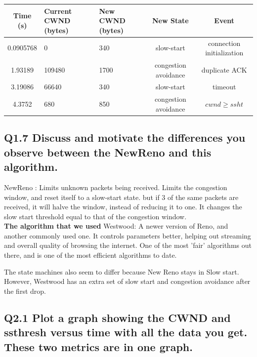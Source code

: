 \documentclass{article}
\begin{document}
\begin{table}[H]
\centering
\begin{tabular}{|c|p{25mm}|p{20mm}|c|c|}
\hline Time (s)    & Current CWND (bytes)    & New CWND (bytes)    & New State    & Event \\
\hline 0.0905768   & 0                       & 340          & slow-start          & connection initialization\\
\hline 1.93189     & 109480                  & 1700        & congestion avoidance   & duplicate ACK\\
\hline 3.19086     & 66640                  & 340          & slow-start          & timeout\\ 
\hline 4.3752     & 680                     & 850          & congestion avoidance   & $cwnd \geq ssht$ \\
\hline  
\end{tabular} 
\end{table}



\subsection{Q1.7 Discuss and motivate the differences you observe
between the NewReno and this algorithm.} %

NewReno : Limits unknown packets being received. Limits the congestion window, and reset itself to a slow-start state. but if 3 of the same packets are received, it will halve the window, instead of reducing it to one. It changes the slow start threshold equal to that of the congestion window.
\\
\textbf{The algorithm that we used}
Westwood: A newer version of Reno, and another commonly used one. It controls parameters better, helping out streaming and overall quality of browsing the internet. One of the most 'fair' algorithms out there, and is one of the most efficient algorithms to date. 

The state machines also seem to differ because New Reno stays in Slow start. However, Westwood has an extra set of slow start and congestion avoidance after the first drop. 


\subsection{Q2.1 Plot a graph showing the CWND and ssthresh versus time
with all the data you get. These two metrics are in one graph.}
\end{document}
